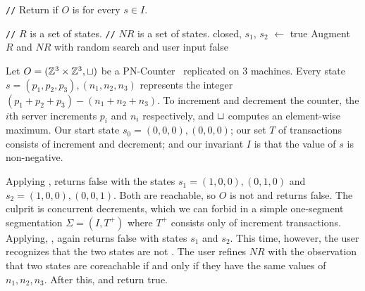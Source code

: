 \newcommand{\algocomment}[1]{\State \textcolor{flatdenim}{\texttt{//} #1}}
\begin{algorithm}[t]
  \caption{%
    Interactive \invariantconfluence{} decision procedure for arbitrary start
    state $s \in I$
  }%
  \begin{algorithmic}
    \algocomment{Return if $O$ is  for every $s \in I$.}
      \State \Return {}
    \EndFunction

    \State

    \algocomment{$R$ is a set of \TIcoreachable{} states.}
    \algocomment{$NR$ is a set of \TIcounreachable{} states.}
      \State closed, $s_1$, $s_2$ $\gets$ 
        \State \Return true
      \EndIf
      \State Augment $R$ and $NR$ with random search and user input
        \Return false
      \Else\
        \Return {}
      \EndIf
    \EndFunction
  \end{algorithmic}
\end{algorithm}

\begin{example}
  Let $O = (\mathbb{Z}^3 \times \mathbb{Z}^3, \sqcup)$ be a
  PN-Counter~\cite{shapiro2011comprehensive} replicated on $3$ machines. Every
  state $s = (p_1, p_2, p_3), (n_1, n_2, n_3)$ represents the integer $(p_1 +
  p_2 + p_3) - (n_1 + n_2 + n_3)$. To increment and decrement the counter, the
  $i$th server increments $p_i$ and $n_i$ respectively, and $\sqcup$ computes an
  element-wise maximum. Our start state $s_0 = (0, 0, 0), (0, 0, 0)$; our set
  $T$ of transactions consists of increment and decrement; and our invariant
  $I$ is that the value of $s$ is non-negative.

  Applying , \IsIclosed{} returns false
  with the states $s_1 = (1, 0, 0), (0, 1, 0)$ and $s_2 = (1, 0, 0), (0, 0,
  1)$. Both are reachable, so $O$ is not \sTIconfluent{} and
   returns false.  The culprit is
  concurrent decrements, which we can forbid in a simple one-segment
  segmentation $\Sigma = (I, T^+)$ where $T^+$ consists only of increment
  transactions. Applying, ,
  \IsIclosed{} again returns false with states $s_1$ and $s_2$. This time,
  however, the user recognizes that the two states are not
  . The user refines $NR$ with the observation that
  two states are coreachable if and only if they have the same values of $n_1,
  n_2, n_3$. After this, \IsIclosed{} and
   return true.
\end{example}

